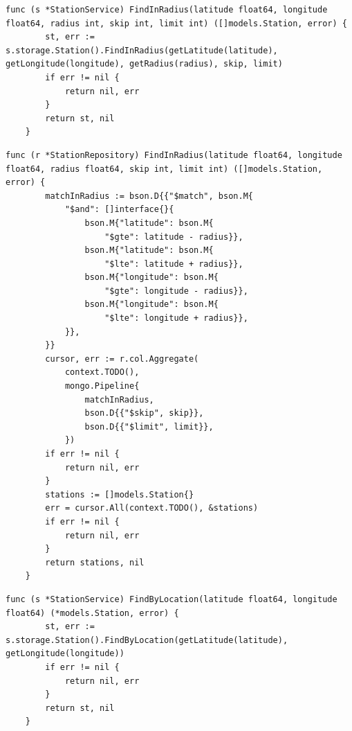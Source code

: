 \begin{lstlisting}[label=list:service_read_station_FindInRadius,caption=Serwis wyszukiwania stacji ładowniczych w pobliżu podanych współrzędnych na mapie Ziemi,basicstyle=\tiny\ttfamily]
    func (s *StationService) FindInRadius(latitude float64, longitude float64, radius int, skip int, limit int) ([]models.Station, error) {
        st, err := s.storage.Station().FindInRadius(getLatitude(latitude), getLongitude(longitude), getRadius(radius), skip, limit)
        if err != nil {
            return nil, err
        }
        return st, nil
    }
\end{lstlisting}
\begin{lstlisting}[label=list:repo_read_station_FindInRadius,caption=Wyszukiwanie stacji ładowniczych w bazie danych w pobliżu podanych współrzędnych na mapie Ziemi,basicstyle=\tiny\ttfamily]
    func (r *StationRepository) FindInRadius(latitude float64, longitude float64, radius float64, skip int, limit int) ([]models.Station, error) {
        matchInRadius := bson.D{{"$match", bson.M{
            "$and": []interface{}{
                bson.M{"latitude": bson.M{
                    "$gte": latitude - radius}},
                bson.M{"latitude": bson.M{
                    "$lte": latitude + radius}},
                bson.M{"longitude": bson.M{
                    "$gte": longitude - radius}},
                bson.M{"longitude": bson.M{
                    "$lte": longitude + radius}},
            }},
        }}
        cursor, err := r.col.Aggregate(
            context.TODO(),
            mongo.Pipeline{
                matchInRadius,
                bson.D{{"$skip", skip}},
                bson.D{{"$limit", limit}},
            })
        if err != nil {
            return nil, err
        }
        stations := []models.Station{}
        err = cursor.All(context.TODO(), &stations)
        if err != nil {
            return nil, err
        }
        return stations, nil
    }
\end{lstlisting}
\begin{lstlisting}[label=list:service_read_station_FindByLocation,caption=Serwis wyszukiwania stacji ładowniczych według współrzędnych na mapie Ziemi,basicstyle=\tiny\ttfamily]
    func (s *StationService) FindByLocation(latitude float64, longitude float64) (*models.Station, error) {
        st, err := s.storage.Station().FindByLocation(getLatitude(latitude), getLongitude(longitude))
        if err != nil {
            return nil, err
        }
        return st, nil
    }
\end{lstlisting}

